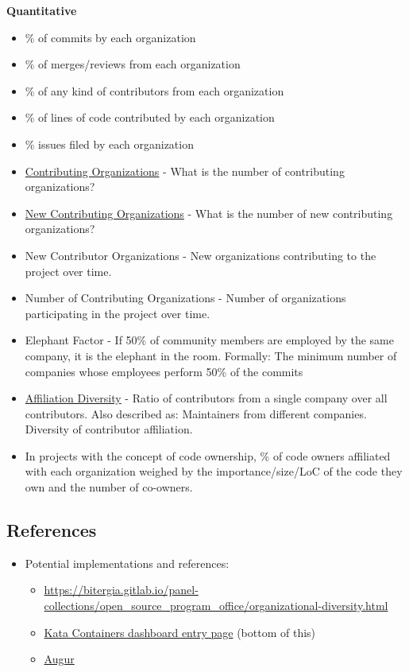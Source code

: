 \textbf{Quantitative}

\begin{itemize}
\tightlist
\item
  \% of commits by each organization
\item
  \% of merges/reviews from each organization
\item
  \% of any kind of contributors from each organization
\item
  \% of lines of code contributed by each organization
\item
  \% issues filed by each organization
\item
  \href{https://github.com/chaoss/metrics/blob/master/activity-metrics/contributing-organizations.md}{Contributing
  Organizations} - What is the number of contributing organizations?
\item
  \href{https://github.com/chaoss/metrics/blob/master/activity-metrics/new-contributing-organizations.md}{New
  Contributing Organizations} - What is the number of new contributing
  organizations?
\item
  New Contributor Organizations - New organizations contributing to the
  project over time.
\item
  Number of Contributing Organizations - Number of organizations
  participating in the project over time.
\item
  Elephant Factor - If 50\% of community members are employed by the
  same company, it is the elephant in the room. Formally: The minimum
  number of companies whose employees perform 50\% of the commits
\item
  \href{https://github.com/chaoss/metrics/blob/master/activity-metrics/contributor-diversity.md}{Affiliation
  Diversity} - Ratio of contributors from a single company over all
  contributors. Also described as: Maintainers from different companies.
  Diversity of contributor affiliation.
\item
  In projects with the concept of code ownership, \% of code owners
  affiliated with each organization weighed by the importance/size/LoC
  of the code they own and the number of co-owners.
\end{itemize}

\hypertarget{references}{%
\subsection{References}\label{references}}

\begin{itemize}
\tightlist
\item
  Potential implementations and references:

  \begin{itemize}
  \tightlist
  \item
    \url{https://bitergia.gitlab.io/panel-collections/open_source_program_office/organizational-diversity.html}
  \item
    \href{https://katacontainers.biterg.io}{Kata Containers dashboard
    entry page} (bottom of this)
  \item
    \href{https://github.com/chaoss/augur}{Augur}
  \end{itemize}
\end{itemize}
